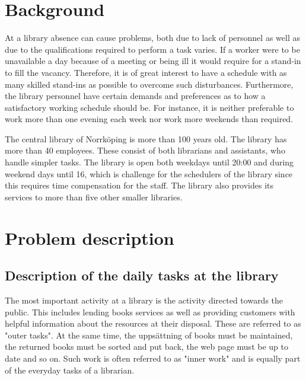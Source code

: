 

\section{Background}
At a library absence can cause problems, both due to lack of personnel as well as due to the qualifications required to perform a task varies. If a worker were to be unavailable a day because of a meeting or being ill it would require for a stand-in to fill the vacancy. Therefore, it is of great interest to have a schedule with as many skilled stand-ins as possible to overcome such disturbances. Furthermore, the library personnel have certain demands and preferences as to how a satisfactory working schedule should be. For instance, it is neither preferable to work more than one evening each week nor work more weekends than required.

The central library of Norrköping is more than 100 years old. The library has more than 40 employees. These consist of both librarians and assistants, who handle simpler tasks.  The library is open both weekdays until 20:00 and during weekend days until 16, which is challenge for the schedulers of the library since this requires time compensation for the staff. The library also provides its services to more than five other smaller libraries.%

\section{Problem description}

\subsection{Description of the daily tasks at the library}
The most important activity at a library is the activity directed towards the public. This includes lending books services as well as providing customers with helpful information about the resources at their disposal. These are referred to as "outer tasks". At the same time, the uppsättning of books must be maintained, the returned books must be sorted and put back, the web page must be up to date and so on. Such work is often referred to as "inner work" and is equally part of the everyday tasks of a librarian. 


